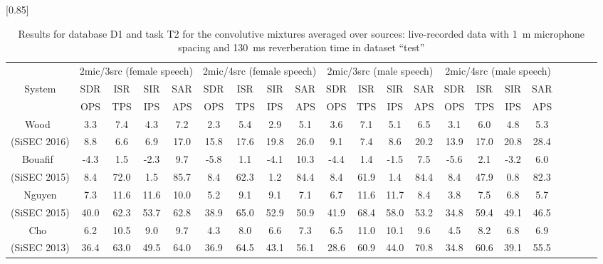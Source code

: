 \documentclass{article}
\begin{document}

\begin{table*}[t]
	\caption{Results for database D1 and task T2 for the convolutive mixtures averaged over sources: 
live-recorded data with 1~m microphone spacing and 130~ms reverberation time in dataset ``test''}
	\vspace{-5pt}
	\begin{center}
	\scalebox{0.85}[0.85]{ %
		\begin{tabular}{|c|cccc|cccc|cccc|cccc|cccc|} \hline
			\multicolumn{1}{|c|}{}					& \multicolumn{4}{c|}{2mic/3src (female speech)}	& \multicolumn{4}{c|}{2mic/4src (female speech)}	& \multicolumn{4}{c|}{2mic/3src (male speech)} & \multicolumn{4}{c|}{2mic/4src (male speech)}\\
			\multicolumn{1}{|c|}{System}				&	SDR	&	ISR	& SIR	&	SAR			&	SDR	&	ISR &	SIR	&	SAR			&	SDR	&	ISR	&	SIR	&	SAR		&	SDR	&	ISR	&	SIR	&	SAR	\\
			\multicolumn{1}{|c|}{}					&	OPS	&	TPS	&	IPS	&	APS			&	OPS	&	TPS	&	IPS	&	APS			&	OPS	&	TPS	&	IPS	&	APS		&	OPS	&	TPS	&	IPS	&	APS	\\ \hline \hline
			\multirow{1}{*}{Wood~\cite{Wood}}		&	3.3	&	7.4	&	4.3	&	7.2			&	2.3	&	5.4	&	2.9	&	5.1			&	3.6	&	7.1	&	5.1	&	6.5		&	3.1	&	6.0	&	4.8	&	5.3	\\
			\multirow{1}{*}{(SiSEC 2016)}			&	8.8	&	6.6	&	6.9	&	17.0			&	15.8	&	17.6	&	19.8	&	26.0			&	9.1	&	7.4	&	8.6	&	20.2		&	13.9	&	17.0	&	20.8	&	28.4	\\ \hline
			\multirow{1}{*}{Bouafif~\cite{Bouafif}}		&	-4.3	&	1.5	&	-2.3	&	9.7			&	-5.8	&	1.1	&	-4.1	&	10.3			&	-4.4	&	1.4	&	-1.5	&	7.5		&	-5.6	&	2.1	&	-3.2	&	6.0	\\
			\multirow{1}{*}{(SiSEC 2015)}			&	8.4	&	72.0	&	1.5	&	85.7			&	8.4	&	62.3	&	1.2	&	84.4			&	8.4	&	61.9	&	1.4	&	84.4		&	8.4	&	47.9	&	0.8	&	82.3	\\ \hline
			\multirow{1}{*}{Nguyen}					&	7.3	&	11.6	&	11.6	&	10.0			&	5.2	&	9.1	&	9.1	&	7.1			&	6.7	&	11.6	&	11.7	&	8.4		&	3.8	&	7.5	&	6.8	&	5.7	\\
			\multirow{1}{*}{(SiSEC 2015)}			&	40.0	&	62.3	&	53.7	&	62.8			&	38.9	&	65.0	&	52.9	&	50.9			&	41.9	&	68.4	&	58.0	&	53.2		&	34.8	&	59.4	&	49.1	&	46.5	\\ \hline
			\multirow{1}{*}{Cho~\cite{Cho1}}			&	6.2	&	10.5	&	9.0	&	9.7			&	4.3	&	8.0	&	6.6	&	7.3			&	6.5	&	11.0	&	10.1	&	9.6		&	4.5	&	8.2	&	6.8	&	6.9	\\
			\multirow{1}{*}{(SiSEC 2013)}			&	36.4	&	63.0	&	49.5	&	64.0			&	36.9	&	64.5	&	43.1	&	56.1			&	28.6	&	60.9	&	44.0	&	70.8		&	34.8	&	60.6	&	39.1	&	55.5	\\ \hline

\end{tabular}}
\end{center}
\end{table*}
\end{document}
